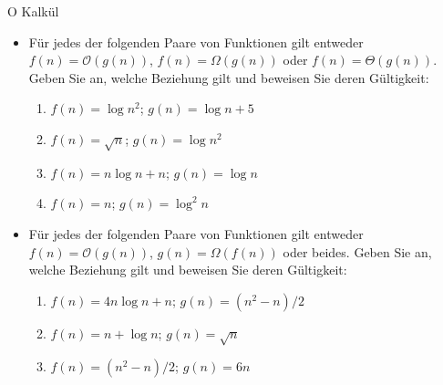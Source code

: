 \documentclass[18pt]{beamer}
\newcommand{\Oh}{\mathcal{O}}
\begin{document}
\begin{frame}{O Kalkül}
  \begin{itemize}
    \item Für jedes der folgenden Paare von Funktionen gilt entweder $f(n) = \Oh (g(n))$, $f(n) = \Omega(g(n))$ oder $f(n) = \Theta(g(n))$. Geben Sie an, welche Beziehung gilt und beweisen Sie deren Gültigkeit:
    \begin{enumerate}
      \item  $f(n) = \log n^2$; $g(n)= \log n + 5$
      \item  $f(n) = \sqrt{n}$; $g(n)= \log n^2$
      \item  $f(n) = n \log n + n$; $g(n)= \log n$
      \item  $f(n) = n$; $g(n)= \log^2 n$
    \end{enumerate}
    \item Für jedes der folgenden Paare von Funktionen gilt entweder $f(n) = \Oh(g(n))$, $g(n) = \Omega(f(n))$ oder beides. Geben Sie an, welche Beziehung gilt und beweisen Sie deren Gültigkeit:
    \begin{enumerate}
      \item  $f(n) = 4n \log n +n$; $g(n)= (n^2 -n) / 2$
      \item  $f(n) = n + \log n$; $g(n)= \sqrt{n}$
      \item  $f(n) = (n^2 -n)/2$; $g(n)= 6n$
    \end{enumerate}
  \end{itemize}
\end{frame}
\end{document}
